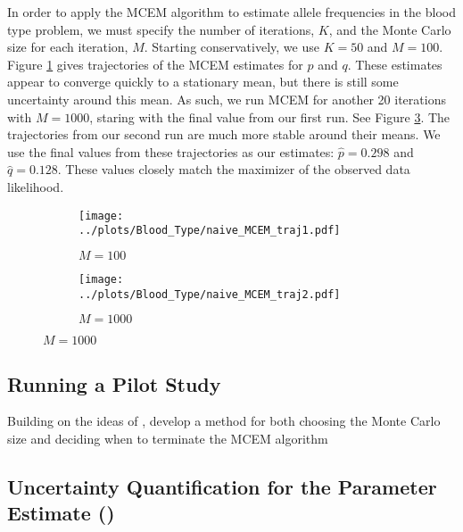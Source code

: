 \documentclass[11pt, oneside]{article}   	%
\begin{document}
In order to apply the MCEM algorithm to estimate allele frequencies in the blood type problem, we must specify the number of iterations, $K$, and the Monte Carlo size for each iteration, $M$. Starting conservatively, we use $K=50$ and $M=100$. Figure \ref{fig:blood_naive_MCEM_traj1} gives trajectories of the MCEM estimates for $p$ and $q$. These estimates appear to converge quickly to a stationary mean, but there is still some uncertainty around this mean. As such, we run MCEM for another 20 iterations with $M=1000$, staring with the final value from our first run. See Figure \ref{fig:blood_naive_MCEM_traj2}. The trajectories from our second run are much more stable around their means. We use the final values from these trajectories as our estimates: $\hat{p} = 0.298$ and $\hat{q} = 0.128$. These values closely match the maximizer of the observed data likelihood.

\begin{figure}
    \centering
    \caption{Trajectory of MCEM estimates for $p$ and $q$ for the blood type example.}
    \label{fig:blood_naive_MCEM_traj}
    \begin{subfigure}{0.45\textwidth}
        \centering
        \texttt{[image: ../plots/Blood\_Type/naive\_MCEM\_traj1.pdf]}
        \caption{$M=100$}
        \label{fig:blood_naive_MCEM_traj1}
    \end{subfigure}
    \hfill
    \begin{subfigure}{0.45\textwidth}
        \centering
        \texttt{[image: ../plots/Blood\_Type/naive\_MCEM\_traj2.pdf]}
        \caption{$M=1000$}
        \label{fig:blood_naive_MCEM_traj2}
    \end{subfigure}
   
\end{figure}

\subsection{Running a Pilot Study \citep{Cha95}}

Building on the ideas of \citeauthor{Wei90}, \citet{Cha95} develop a method for both choosing the Monte Carlo size and deciding when to terminate the MCEM algorithm


\subsection{Uncertainty Quantification for the Parameter Estimate (\citealp{Boo99})}
\end{document}
